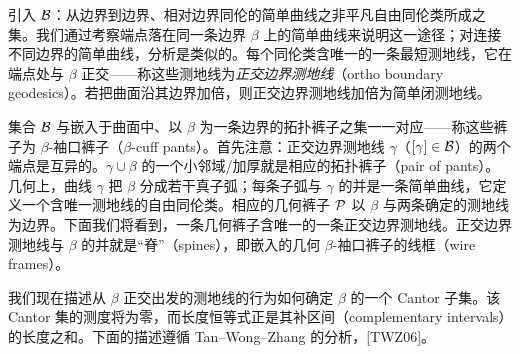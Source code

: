 引入 $\mathcal{B}$：从边界到边界、相对边界同伦的简单曲线之非平凡自由同伦类所成之集。我们通过考察端点落在同一条边界 $\beta$ 上的简单曲线来说明这一途径；对连接不同边界的简单曲线，分析是类似的。每个同伦类含唯一的一条最短测地线，它在端点处与 $\beta$ 正交——称这些测地线为\emph{正交边界测地线}（ortho boundary geodesics）。若把曲面沿其边界加倍，则正交边界测地线加倍为简单闭测地线。

集合 $\mathcal{B}$ 与嵌入于曲面中、以 $\beta$ 为一条边界的拓扑裤子之集一一对应——称这些裤子为 $\beta$-袖口裤子（$\beta$-cuff pants）。首先注意：正交边界测地线 $\gamma$（$[\gamma]\in\mathcal{B}$）的两个端点是互异的。$\gamma\cup\beta$ 的一个小邻域/加厚就是相应的拓扑裤子（pair of pants）。几何上，曲线 $\gamma$ 把 $\beta$ 分成若干真子弧；每条子弧与 $\gamma$ 的并是一条简单曲线，它定义一个含唯一测地线的自由同伦类。相应的几何裤子 $\mathcal{P}$ 以 $\beta$ 与两条确定的测地线为边界。下面我们将看到，一条几何裤子含唯一的一条正交边界测地线。正交边界测地线与 $\beta$ 的并就是“脊”（spines），即嵌入的几何 $\beta$-袖口裤子的线框（wire frames）。


我们现在描述从 $\beta$ 正交出发的测地线的行为如何确定 $\beta$ 的一个 Cantor 子集。该 Cantor 集的测度将为零，而长度恒等式正是其补区间（complementary intervals）的长度之和。下面的描述遵循 Tan--Wong--Zhang 的分析，[TWZ06]。
